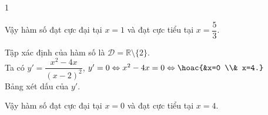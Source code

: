 \begin{bt}
{\begin{enumEX}{1}
\begin{center}
			\end{center}
			Vậy hàm số đạt cực đại tại $x=1$ và đạt cực tiểu  tại $x=\dfrac{5}{3}$.
			\item 
			Tập xác định của hàm số là $  \mathscr{D}=\mathbb{R} \setminus\{2\}$.\\
			Ta  có $y'=\dfrac{x^2-4 x}{(x-2)^2}$, $y'=0 \Leftrightarrow x^2-4 x=0 \Leftrightarrow\hoac{&x=0 \\& x=4.}$\\
			Bảng  xét dấu của $y'$.
			\begin{center}
			\end{center}
			Vậy hàm  số đạt cực đại tại $x=0$ và đạt cực tiểu tại $x=4$.
		\end{enumEX}
	 }
\end{bt}

